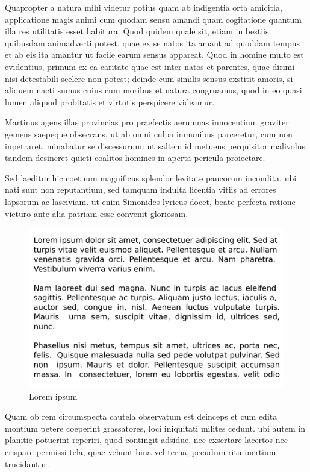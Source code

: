 \documentclass[a4paper]{article}
\begin{document}
{{Quapropter a natura mihi videtur potius quam ab indigentia orta amicitia, applicatione magis animi cum quodam sensu amandi quam cogitatione quantum illa res utilitatis esset habitura. Quod quidem quale sit, etiam in bestiis quibusdam animadverti potest, quae ex se natos ita amant ad quoddam tempus et ab eis ita amantur ut facile earum sensus appareat. Quod in homine multo est evidentius, primum ex ea caritate quae est inter natos et parentes, quae dirimi nisi detestabili scelere non potest; deinde cum similis sensus exstitit amoris, si aliquem nacti sumus cuius cum moribus et natura congruamus, quod in eo quasi lumen aliquod probitatis et virtutis perspicere videamur.

}

Martinus agens illas provincias pro praefectis aerumnas innocentium graviter gemens saepeque obsecrans, ut ab omni culpa inmunibus parceretur, cum non inpetraret, minabatur se discessurum: ut saltem id metuens perquisitor malivolus tandem desineret quieti coalitos homines in aperta pericula proiectare.

Sed laeditur hic coetuum magnificus splendor levitate paucorum incondita, ubi nati sunt non reputantium, sed tamquam indulta licentia vitiis ad errores lapsorum ac lasciviam. ut enim Simonides lyricus docet, beate perfecta ratione vieturo ante alia patriam esse convenit gloriosam.

\begin{figure}[htbp]
  \begin{center}
    \includegraphics[width=.98\textwidth]{Lorem_ipsum_flush_justified.png}
  \end{center}
  \caption{Lorem ipsum}
  \label{fig:3}
\end{figure}


Quam ob rem circumspecta cautela observatum est deinceps et cum edita montium petere coeperint grassatores, loci iniquitati milites cedunt. ubi autem in planitie potuerint reperiri, quod contingit adsidue, nec exsertare lacertos nec crispare permissi tela, quae vehunt bina vel terna, pecudum ritu inertium trucidantur.

}
\end{document}
